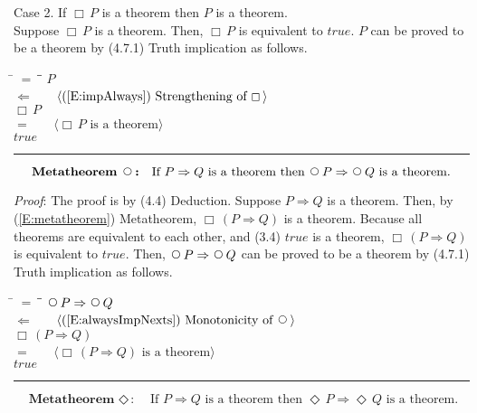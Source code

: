 \documentclass[12pt, fleqn, leqno]{article}
\newcommand{\lgap}{2pt}                             %
\newcommand{\mymathindent}{24pt}                    %
\newcommand{\impl}{\ensuremath{\Rightarrow}}        %
\newcommand{\foll}{\ensuremath{\Leftarrow}}         %
\newcommand{\Next}{\;\,\text{\raisebox{3.5pt}{\circle{6}}}}
\newcommand{\Event}{\Diamond\,}
\newcommand{\Always}{\Box\,}
\newcommand{\myqed}{\rule[-.23ex]{1.2ex}{2.0ex}}
\newcommand{\myqedtab}{\hspace{384pt}}              %
\newcommand{\Gll} {\langle}                         %
\newcommand{\Ggg} {\rangle}                         %
\newcommand{\Hint}[1]     {\ \ \ $\Gll              \mbox{#1} \Ggg$ }   %
\begin{document}
Case 2. If $\Always P$ is a theorem then $P$ is a theorem.\\
Suppose $\Always P$ is a theorem.
Then, $\Always P$ is equivalent to $true$.
$P$ can be proved to be a theorem by (4.7.1) Truth implication as follows.
\begin{tabbing}
\hspace{\mymathindent} \= $= \;$ \= \myqedtab \= \kill
\> \> $P$\\[\lgap]
\> $\foll$ \> \Hint{(\ref{E:impAlways}) Strengthening of $\Always$} \\[\lgap]
\> \> $\Always P$\\[\lgap]
\> $=$ \> \Hint{$\Always P$ is a theorem} \\[\lgap]
\> \> $true$ \quad \myqed
\end{tabbing}
\begin{equation}\label{E:metaNext}
\textbf{Metatheorem $\Next$:}\quad \text{If } P\impl Q \text{ is a theorem then } \Next P\impl\Next Q \text{ is a theorem.}
\end{equation}

\emph{Proof}: The proof is by (4.4) Deduction.
Suppose $P\impl Q$ is a theorem.
Then, by (\ref{E:metatheorem}) Metatheorem, $\Always (P\impl Q)$ is a theorem.
Because all theorems are equivalent to each other, and (3.4) $true$ is a theorem, $\Always (P\impl Q)$ is equivalent to $true$.
Then, $\Next P\impl\Next Q$ can be proved to be a theorem by (4.7.1) Truth implication as follows.
\begin{tabbing}
\hspace{\mymathindent} \= $= \;$ \= \myqedtab \= \kill
\> \> $\Next P\impl\Next Q$\\[\lgap]
\> $\foll$ \> \Hint{(\ref{E:alwaysImpNexts}) Monotonicity of $\Next$} \\[\lgap]
\> \> $\Always (P\impl Q)$\\[\lgap]
\> $=$ \> \Hint{$\Always (P\impl Q)$ is a theorem} \\[\lgap]
\> \> $true$ \quad \myqed
\end{tabbing}
\begin{equation}\label{E:metaEvent}
\textbf{Metatheorem $\Event$:}\quad \text{If } P\impl Q \text{ is a theorem then } \Event P\impl\Event Q \text{ is a theorem.}
\end{equation}
\end{document}

